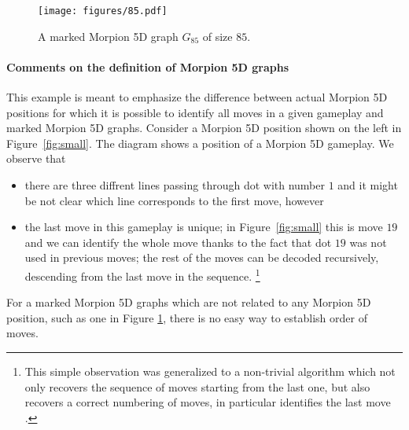 \begin{figure}[h]
    \centering
    \texttt{[image: figures/85.pdf]}
     \caption{
     A marked Morpion 5D graph $G_{85}$ of size $85$.
	}
    \label{fig:85}
\end{figure}

\paragraph*{Comments on the definition of Morpion 5D graphs}


\begin{example}
This example is meant to emphasize the difference between 
actual Morpion 5D positions for which it is possible to identify all moves in a given gameplay and marked Morpion 5D graphs.
Consider a Morpion 5D position shown on the left in Figure~\ref{fig:small}. %
The diagram shows a position of a Morpion 5D gameplay.
We observe that %
  \begin{itemize}
    \item   %
            there are three diffrent lines passing through dot with number $1$ and it might be not clear which line corresponds to the first move, however
    \item   the last move in this gameplay is unique; in Figure~\ref{fig:small} this is move $19$ and we can identify the whole move thanks to the fact  that dot $19$ was not used in previous moves; the rest of the moves can be decoded recursively, descending from the last move in the sequence. \footnote{This simple observation was generalized to a non-trivial algorithm which not only recovers the sequence of moves starting from the last one, but also recovers a correct numbering of moves, in particular identifies the last move \cite{demaine}.} %
  \end{itemize}
For a marked Morpion 5D graphs which are not related to any Morpion 5D position, such as one in Figure \ref{fig:85}, there is no easy way to establish order of moves.
\end{example}


